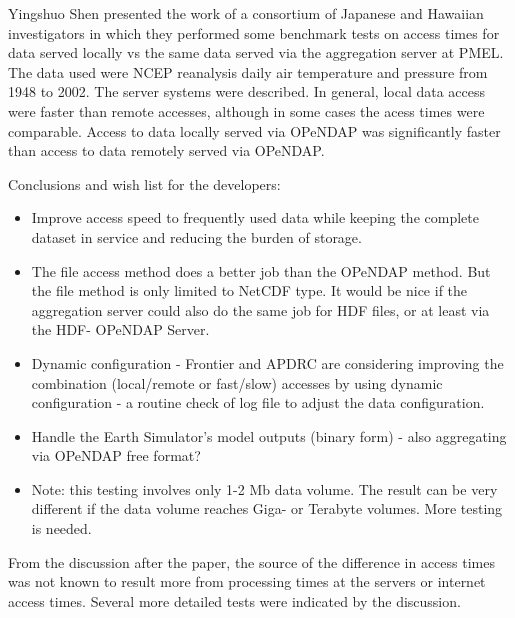 Yingshuo Shen presented the work of a consortium of Japanese and
Hawaiian investigators in which they performed some benchmark
tests on access times for data served locally vs the same data
served via the aggregation server at \ac{PMEL}.  The data used
were NCEP reanalysis daily air temperature and pressure from
1948 to 2002.  The server systems were described.  In general,
local data access were faster than remote accesses, although
in some cases the acess times were comparable.  Access to 
data locally served via OPeNDAP was significantly faster than
access to data remotely served via OPeNDAP.

Conclusions and wish list for the developers:

\begin{itemize}
\item Improve access speed to frequently used data while keeping the
  complete dataset in service and reducing the burden of storage.
  
\item The file access method does a better job than the OPeNDAP
  method.  But the file method is only limited to \ac{NetCDF} type.
  It would be nice if the aggregation server could also do the same
  job for \ac{HDF} files, or at least via the \ac{HDF}- \ac{OPeNDAP}
  Server.
\item Dynamic configuration - Frontier and \ac{APDRC} are considering
  improving the combination (local/remote or fast/slow) accesses by
  using dynamic configuration - a routine check of log file to adjust
  the data configuration.
\item Handle the Earth Simulator's model outputs (binary form) - also
  aggregating via OPeNDAP free format?
\item Note: this testing involves only 1-2 Mb data volume.  The result
  can be very different if the data volume reaches Giga- or Terabyte
  volumes.  More testing is needed.
\end{itemize}

From the discussion after the paper, the source of the difference
in access times was not known to result more from processing
times at the servers or internet access times.  Several
more detailed tests were indicated by the discussion.

%
%
%
%

